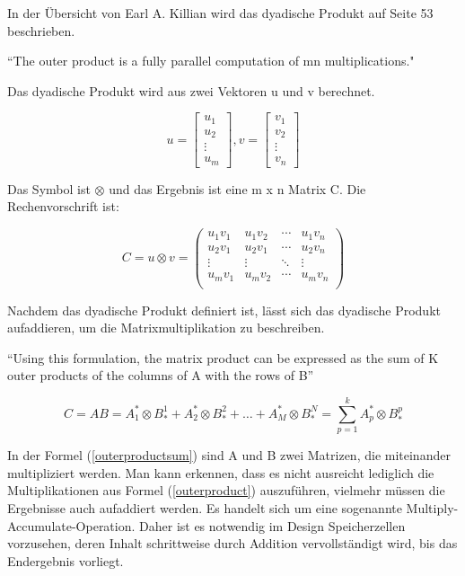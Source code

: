 In der Übersicht \cite{design_VME} von Earl A. Killian wird das dyadische Produkt auf Seite 53 beschrieben.

``The outer product is a fully parallel computation of mn multiplications."

Das dyadische Produkt wird aus zwei Vektoren u und v berechnet.

\[ u = \begin{bmatrix} u_{1} \\ u_{2} \\ \vdots \\ u_{m} \end{bmatrix}, v = \begin{bmatrix} v_{1} \\ v_{2} \\ \vdots \\ v_{n} \end{bmatrix} \]

Das Symbol ist $\otimes$ und das Ergebnis ist eine m x n Matrix C. Die Rechenvorschrift ist:

\begin{equation}\label{outerproduct}
 C = u \otimes v = \begin{pmatrix}
          u_{1}v_{1} & u_{1}v_{2} & \cdots & u_{1}v_{n}\\
          u_{2}v_{1} & u_{2}v_{1} & \cdots & u_{2}v_{n}\\
          \vdots & \vdots & \ddots & \vdots\\
          u_{m}v_{1} & u_{m}v_{2} & \cdots & u_{m}v_{n}\\
      \end{pmatrix}
    \end{equation}


Nachdem das dyadische Produkt definiert ist, lässt sich das dyadische Produkt aufaddieren, um die Matrixmultiplikation zu beschreiben.

``Using this formulation, the matrix product can be expressed as the sum of K outer products of the
columns of A with the rows of B''

\begin{equation}\label{outerproductsum}
 C = AB = A_{1}^{*} \otimes B_{*}^{1} + A_{2}^{*} \otimes B_{*}^{2} + \ldots + A_{M}^{*} \otimes B_{*}^{N} = \sum_{p=1}^k A_{p}^{*} \otimes B_{*}^{p}
\end{equation}

In der Formel (\ref{outerproductsum}) sind A und B zwei Matrizen, die miteinander multipliziert werden. Man kann erkennen, dass es nicht ausreicht lediglich die Multiplikationen aus Formel (\ref{outerproduct}) auszuführen, vielmehr müssen die Ergebnisse auch aufaddiert werden. Es handelt sich um eine sogenannte Multiply-Accumulate-Operation. Daher ist es notwendig im Design Speicherzellen vorzusehen, deren Inhalt schrittweise durch Addition vervollständigt wird, bis das Endergebnis vorliegt.

